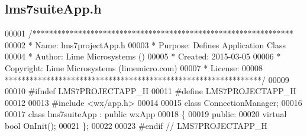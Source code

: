 \subsection{lms7suite\+App.\+h}
\label{lms7suiteApp_8h_source}

\begin{DoxyCode}
00001 \textcolor{comment}{/***************************************************************}
00002 \textcolor{comment}{ * Name:      lms7projectApp.h}
00003 \textcolor{comment}{ * Purpose:   Defines Application Class}
00004 \textcolor{comment}{ * Author:    Lime Microsystems ()}
00005 \textcolor{comment}{ * Created:   2015-03-05}
00006 \textcolor{comment}{ * Copyright: Lime Microsystems (limemicro.com)}
00007 \textcolor{comment}{ * License:}
00008 \textcolor{comment}{ **************************************************************/}
00009 
00010 \textcolor{preprocessor}{#ifndef LMS7PROJECTAPP\_H}
00011 \textcolor{preprocessor}{#define LMS7PROJECTAPP\_H}
00012 
00013 \textcolor{preprocessor}{#include <wx/app.h>}
00014 
00015 \textcolor{keyword}{class }ConnectionManager;
00016 
00017 \textcolor{keyword}{class }lms7suiteApp : \textcolor{keyword}{public} wxApp
00018 \{
00019     \textcolor{keyword}{public}:
00020         \textcolor{keyword}{virtual} \textcolor{keywordtype}{bool} OnInit();      
00021 \};
00022 
00023 \textcolor{preprocessor}{#endif // LMS7PROJECTAPP\_H}
\end{DoxyCode}
